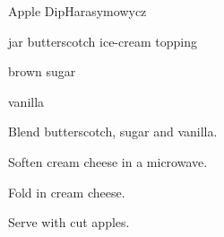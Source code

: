 \begin{recipe}{Apple Dip}{Harasymowycz}{}

\begin{ingredients}
\item jar butterscotch ice-cream topping
\item \C{\half} brown sugar
\item {} vanilla
\item {} 
\end{ingredients}

\begin{directions}
\item Blend butterscotch, sugar and vanilla.
\item Soften cream cheese in a microwave.
\item Fold in cream cheese.
\item Serve with cut apples.
\end{directions}

\end{recipe}
